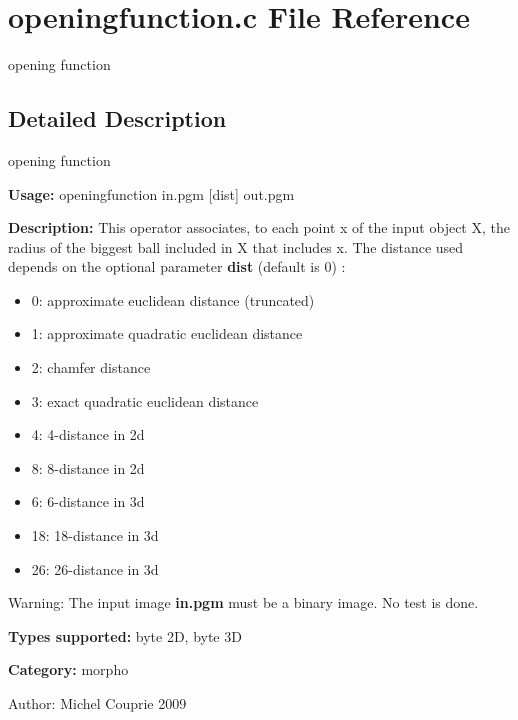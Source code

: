 \section{openingfunction.c File Reference}
\label{openingfunction_8c}
opening function 



\subsection{Detailed Description}
opening function 

{\bf Usage:} openingfunction in.pgm [dist] out.pgm

{\bf Description:} This operator associates, to each point x of the input object X, the radius of the biggest ball included in X that includes x. The distance used depends on the optional parameter {\bf dist} (default is 0) : \begin{itemize}
\item 0: approximate euclidean distance (truncated) \item 1: approximate quadratic euclidean distance \item 2: chamfer distance \item 3: exact quadratic euclidean distance \item 4: 4-distance in 2d \item 8: 8-distance in 2d \item 6: 6-distance in 3d \item 18: 18-distance in 3d \item 26: 26-distance in 3d\end{itemize}
\begin{Desc}
\item[Warning:]The input image {\bf in.pgm} must be a binary image. No test is done.\end{Desc}
{\bf Types supported:} byte 2D, byte 3D

{\bf Category:} morpho

\begin{Desc}
\item[Author:]Michel Couprie 2009 \end{Desc}
